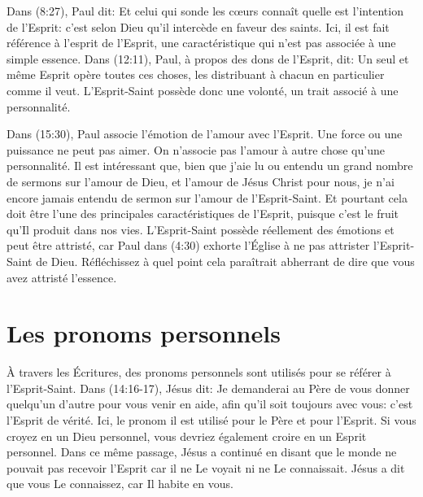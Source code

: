 Dans (8:27), Paul dit\space: \og Et celui qui sonde les cœurs
 connaît quelle est l'intention de l'Esprit\space: c'est selon Dieu qu'il
 intercède en faveur des saints. \fg{} Ici, il est fait référence à l'esprit
  de l'Esprit, une caractéristique qui n'est pas associée à
 une simple essence. Dans (12:11), Paul, à propos des dons de
 l'Esprit, dit\space: \og Un seul et même Esprit opère toutes ces choses, les
 distribuant à chacun en particulier comme il veut. \fg{} L'Esprit-Saint
 possède donc une volonté, un trait associé à une personnalité.

Dans (15:30), Paul associe l'émotion de l'amour avec l'Esprit.
 Une force ou une puissance ne peut pas aimer. On n'associe pas l'amour à autre
 chose qu'une personnalité. Il est intéressant que, bien que j'aie lu ou
 entendu un grand nombre de sermons sur l'amour de Dieu, et l'amour de
 Jésus Christ pour nous, je n'ai encore jamais entendu de sermon sur l'amour de
 l'Esprit-Saint. Et pourtant cela doit être l'une des principales
 caractéristiques de l'Esprit, puisque c'est le fruit qu'Il produit dans nos
 vies. L'Esprit-Saint possède réellement des émotions et peut être attristé,
 car Paul dans (4:30) exhorte l'Église à ne pas attrister
 l'Esprit-Saint de Dieu. Réfléchissez à quel point cela paraîtrait abherrant
 de dire que vous avez attristé l'essence.


\section*{Les pronoms personnels}

À travers les Écritures, des pronoms personnels sont utilisés pour se
 référer à l'Esprit-Saint. Dans (14:16-17), Jésus dit\space:
 \og Je demanderai au Père de vous donner quelqu'un d'autre pour vous
 venir en aide, afin qu'il soit toujours avec vous\space:
 c'est l'Esprit de vérité. \fg{}
 Ici, le pronom \og il \fg{} est utilisé pour le Père et pour l'Esprit.
 Si vous croyez en un Dieu personnel, vous devriez également croire en
 un Esprit personnel. Dans ce même passage, Jésus a continué en disant
 que le monde ne pouvait pas recevoir l'Esprit car il ne Le voyait ni
 ne Le connaissait. Jésus a dit que vous Le connaissez, car Il habite
 en vous.

